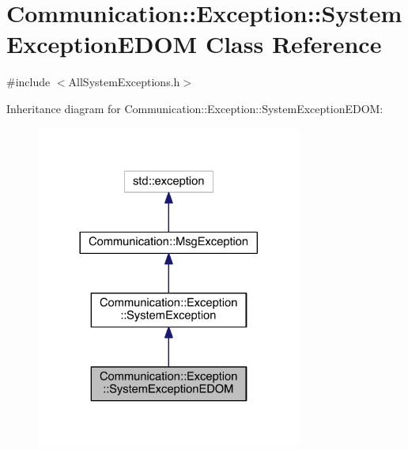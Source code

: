\hypertarget{class_communication_1_1_exception_1_1_system_exception_e_d_o_m}{}\section{Communication\+:\+:Exception\+:\+:System\+Exception\+E\+D\+O\+M Class Reference}
\label{class_communication_1_1_exception_1_1_system_exception_e_d_o_m}


{\ttfamily \#include $<$All\+System\+Exceptions.\+h$>$}



Inheritance diagram for Communication\+:\+:Exception\+:\+:System\+Exception\+E\+D\+O\+M\+:\nopagebreak
\begin{figure}[H]
\begin{center}
\leavevmode
\includegraphics[width=248pt]{class_communication_1_1_exception_1_1_system_exception_e_d_o_m__inherit__graph}
\end{center}
\end{figure}


